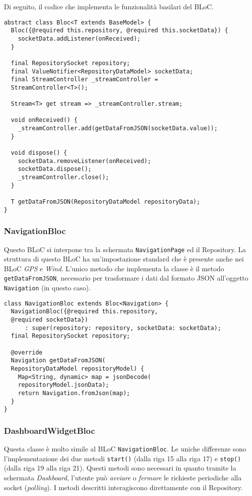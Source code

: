 Di seguito, il codice che implementa le funzionalità basilari del BLoC.
\begin{lstlisting}
abstract class Bloc<T extends BaseModel> {
  Bloc({@required this.repository, @required this.socketData}) {
    socketData.addListener(onReceived);
  }

  final RepositorySocket repository;
  final ValueNotifier<RepositoryDataModel> socketData;
  final StreamController _streamController = 
  StreamController<T>();

  Stream<T> get stream => _streamController.stream;

  void onReceived() {
    _streamController.add(getDataFromJSON(socketData.value));
  }

  void dispose() {
    socketData.removeListener(onReceived);
    socketData.dispose();
    _streamController.close();
  }

  T getDataFromJSON(RepositoryDataModel repositoryData);
}
\end{lstlisting}

\subsubsection{NavigationBloc}
Questo BLoC si interpone tra la schermata \verb|NavigationPage| ed il Repository. La struttura di questo BLoC ha un'impostazione standard che è presente anche nei BLoC \textit{GPS} e \textit{Wind}. L'unico metodo che implementa la classe è il metodo \verb|getDataFromJSON|, necessario per trasformare i dati dal formato JSON all'oggetto \verb|Navigation| (in questo caso).

\begin{lstlisting}
class NavigationBloc extends Bloc<Navigation> {
  NavigationBloc({@required this.repository, 
  @required socketData})
      : super(repository: repository, socketData: socketData);
  final RepositorySocket repository;

  @override
  Navigation getDataFromJSON(
  RepositoryDataModel repositoryModel) {
    Map<String, dynamic> map = jsonDecode(
    repositoryModel.jsonData);
    return Navigation.fromJson(map);
  }
}
\end{lstlisting}

\subsubsection{DashboardWidgetBloc}
Questa classe è molto simile al BLoC \verb|NavigationBloc|. Le uniche differenze sono l'implementazione dei due metodi \verb|start()| (dalla riga 15 alla riga 17) e \verb|stop()| (dalla riga 19 alla riga 21). Questi metodi sono necessari in quanto tramite la schermata \textit{Dashboard}, l'utente può \textit{avviare} o \textit{fermare} le richieste periodiche alla socket (\textit{polling}). I metodi descritti interagiscono direttamente con il Repository.

